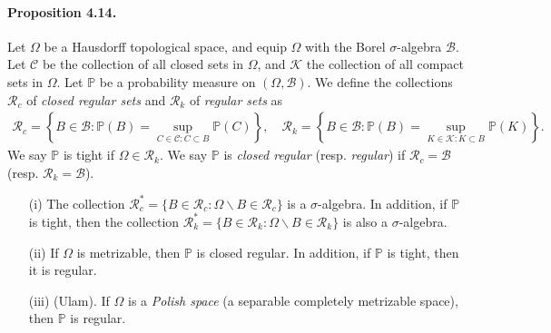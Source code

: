 \documentclass{article}
\numberwithin{equation}{section}
\renewcommand{\P}{\mathbb{P}}
\theoremstyle{plain}
\theoremstyle{definition}
\begin{document}
\paragraph{Proposition 4.14.\label{prop:4.14}} Let $\Omega$ be a Hausdorff topological space, and equip $\Omega$ with the Borel $\sigma$-algebra $\mathscr{B}$. Let $\mathscr{C}$ be the collection of all closed sets in $\Omega$, and $\mathscr{K}$ the collection of all compact sets in $\Omega$. Let $\P$ be a probability measure on $(\Omega,\mathscr{B})$. We define the collections $\mathscr{R}_c$ of \textit{closed regular sets} and $\mathscr{R}_k$ of \textit{regular sets} as
\begin{align*}
	\mathscr{R}_c=\left\{B\in\mathscr{B}: \P(B)=\sup_{C\in\mathscr{C}:C\subset B}\P(C)\right\},\quad \mathscr{R}_k=\left\{B\in\mathscr{B}: \P(B)=\sup_{K\in\mathscr{K}:K\subset B}\P(K)\right\}.
\end{align*}
We say $\P$ is tight if $\Omega\in\mathscr{R}_k$. We say $\P$ is \textit{closed regular} (resp. \textit{regular}) if $\mathscr{R}_c=\mathscr{B}$ (resp. $\mathscr{R}_k=\mathscr{B}$).
\begin{itemize}
\item[(i)] The collection $\mathscr{R}_c^*=\{B\in\mathscr{R}_c:\Omega\backslash B\in\mathscr{R}_c\}$ is a $\sigma$-algebra. In addition, if $\P$ is tight, then the collection $\mathscr{R}_k^*=\{B\in\mathscr{R}_k:\Omega\backslash B\in\mathscr{R}_k\}$ is also a $\sigma$-algebra.

\item[(ii)] If $\Omega$ is metrizable, then $\P$ is closed regular. In addition, if $\P$ is tight, then it is regular.

\item[(iii)] (Ulam). If $\Omega$ is a \textit{Polish space} (a separable completely metrizable space), then $\P$ is regular.
\end{itemize}
\end{document}
